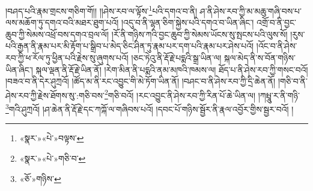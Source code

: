 །བཤད་པའི་རྣམ་གྲངས་གཅིག་གོ།། །།ཤེས་རབ་ལ་ལྟོས་\footnote{«སྣར་»«པེ་»བལྟས་}པའི་དགའ་བ་ནི། ཤ་ནི་ཤེས་རབ་ཀྱི་མ་མཆུ་གཞི་བས་པ་ལས་མཆོག་ཏུ་དགའ་བའི་མཐར་ཐུག་པའོ། །འདུ་བ་ནི་ལྷན་ཅིག་སྐྱེས་པའི་དགའ་བ་ཡིན་ཞིང་། འགྲོ་བ་ནི་བྱང་ཆུབ་ཀྱི་སེམས་འཕྲོ་བས་དགའ་བྲལ་ལོ། །རོ་ནི་གཉིས་ཀའི་བྱང་ཆུབ་ཀྱི་སེམས་ཡོངས་སུ་སྤངས་པའི་ལུས་སོ། །རུས་པའི་རྒྱན་ནི་རྣམ་པར་མི་རྟོག་པ་སྒྲིབ་པ་མེད་ཅིང་ཤིན་ཏུ་རྣམ་པར་དག་པའི་རྣམ་པར་ཤེས་པའོ། །འོང་བ་ནི་ཤེས་རབ་ཀྱི་ཕ་རོལ་ཏུ་ཕྱིན་པའི་རྗེས་སུ་ཞུགས་པའོ། །ཅང་ཏེའུ་ནི་རྡོ་རྗེ་པདྨའི་སྒྲ་ཡིན་ལ། སྐལ་མེད་ནི་ས་བོན་གཉིས་ཡིན་ཞིང་། སྐལ་ལྡན་ནི་རྡོ་རྗེ་ཡིན་ནོ། །རེག་མིན་ནི་པདྨའི་ནམ་མཁའི་ཁམས་ལ། ཐོད་པ་ནི་ཤེས་རབ་ཀྱི་གསང་བའོ། །བཟའ་བ་ནི་དེར་ཤུཀྲའོ། །ཚོད་མ་ནི་རང་འབྱུང་གི་མེ་ཏོག་ཡིན་ནོ། །བཤང་བ་ནི་ཤེས་རབ་ཀྱི་དྲི་ཆེན་ནོ། །གཅི་བ་ནི་ཤེས་རབ་ཀྱི་རྗེས་ཐོགས་སུ་:གཅི་བས་\footnote{«སྣར་»«པེ་»གཅི་བ་}གཅི་བའོ། །རང་འབྱུང་ནི་ཤེས་རབ་ཀྱི་རིན་པོ་ཆེ་ཡིན་ལ། །ཀཔྤཱུ་ར་ནི་གཉི་\footnote{«ཅོ་»གཉིས་}གའི་ཤུཀྲའོ། །ཤ་ཆེན་ནི་རྡོ་རྗེ་དང་ཀཀྐོ་ལ་གཞིབས་པའོ། །དབང་པོ་གཉིས་སྦྱོར་ནི་རྣལ་འབྱོར་གྱིས་སྦྱར་བའོ། །

